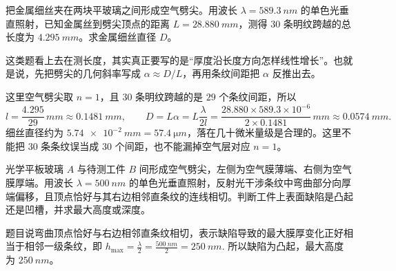 \begin{exercise}[用劈尖条纹间距测金属细丝直径时为什么先写几何斜率]
把金属细丝夹在两块平玻璃之间形成空气劈尖。用波长 \(\lambda=\SI{589.3}{nm}\) 的单色光垂直照射，已知金属丝到劈尖顶点的距离 \(L=\SI{28.880}{mm}\)，测得 \(30\) 条明纹跨越的总长度为 \(\SI{4.295}{mm}\)。求金属细丝直径 \(D\)。
\end{exercise}

\begin{solution}
这类题看上去在测长度，其实真正要写的是“厚度沿长度方向怎样线性增长”。也就是说，先把劈尖的几何斜率写成 \(\alpha\approx D/L\)，再用条纹间距把 \(\alpha\) 反推出去。

这里空气劈尖取 \(n=1\)，且 \(30\) 条明纹跨越的是 \(29\) 个条纹间距，所以
\[
l=\frac{4.295}{29}\,\si{mm}\approx \SI{0.1481}{mm},\qquad
D=L\alpha=L\frac{\lambda}{2l}
=\frac{28.880\times 589.3\times10^{-6}}{2\times0.1481}\,\si{mm}
\approx \SI{0.0574}{mm}.
\]
细丝直径约为 \(\SI{5.74e-2}{mm}=\SI{57.4}{\micro m}\)，落在几十微米量级是合理的。这里不能把 \(30\) 条条纹误当成 \(30\) 个间距，也不能漏掉空气层对应 \(n=1\)。
\end{solution}


\begin{exercise}[空气劈尖条纹弯向厚端时怎样判断凸凹缺陷]
光学平板玻璃 \(A\) 与待测工件 \(B\) 间形成空气劈尖，左侧为空气膜薄端、右侧为空气膜厚端。用波长 \(\lambda=\SI{500}{nm}\) 的单色光垂直照射，反射光干涉条纹中弯曲部分向厚端偏移，且顶点恰好与其右边相邻直条纹的连线相切。判断工件上表面缺陷是凸起还是凹槽，并求最大高度或深度。
\end{exercise}

\begin{solution}
题目说弯曲顶点恰好与右边相邻直条纹相切，表示缺陷导致的最大膜厚变化正好相当于相邻一级条纹，即
 \(h_{\max}=\frac{\lambda}{2} =\frac{\SI{500}{nm}}{2} =\SI{250}{nm}.\) 
所以缺陷为凸起，最大高度为 \(\SI{250}{nm}\)。
\end{solution}
